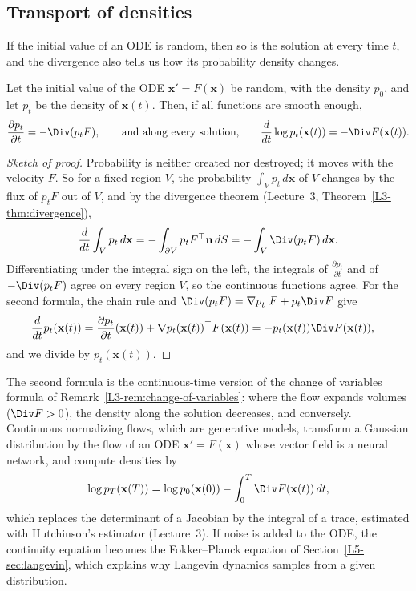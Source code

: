 \subsection{Transport of densities}

If the initial value of an ODE is random, then so is the solution at every time $t$, and the divergence also tells us how its probability density changes.

\begin{proposition}\label{L5-prop:continuity}
    Let the initial value of the ODE $\mathbf{x}' = F(\mathbf{x})$ be random, with the density $p_0$, and let $p_t$ be the density of $\mathbf{x}(t)$. Then, if all functions are smooth enough,
    \[\frac{\partial p_t}{\partial t} = -\Div(p_tF), \qquad \text{and along every solution,} \qquad \frac{d}{dt}\log p_t(\mathbf{x}(t)) = -\Div F(\mathbf{x}(t)).\]
\end{proposition}

\begin{proof}[Sketch of proof]
    Probability is neither created nor destroyed; it moves with the velocity $F$. So for a fixed region $V$, the probability $\int_V p_t\, d\mathbf{x}$ of $V$ changes by the flux of $p_tF$ out of $V$, and by the divergence theorem (Lecture~3, Theorem~\ref{L3-thm:divergence}),
    \[\frac{d}{dt}\int_V p_t\, d\mathbf{x} = -\int_{\partial V} p_tF^\top\mathbf{n}\, dS = -\int_V \Div(p_tF)\, d\mathbf{x}.\]
    Differentiating under the integral sign on the left, the integrals of $\frac{\partial p_t}{\partial t}$ and of $-\Div(p_tF)$ agree on every region $V$, so the continuous functions agree. For the second formula, the chain rule and $\Div(p_tF) = \nabla p_t^\top F + p_t\Div F$ give
    \begin{align*}
        \frac{d}{dt}p_t(\mathbf{x}(t)) &= \frac{\partial p_t}{\partial t}(\mathbf{x}(t)) + \nabla p_t(\mathbf{x}(t))^\top F(\mathbf{x}(t)) = -p_t(\mathbf{x}(t))\Div F(\mathbf{x}(t)),
    \end{align*}
    and we divide by $p_t(\mathbf{x}(t))$.
\end{proof}

The second formula is the continuous-time version of the change of variables formula of Remark~\ref{L3-rem:change-of-variables}: where the flow expands volumes ($\Div F > 0$), the density along the solution decreases, and conversely. Continuous normalizing flows, which are generative models, transform a Gaussian distribution by the flow of an ODE $\mathbf{x}' = F(\mathbf{x})$ whose vector field is a neural network, and compute densities by
\[\log p_T(\mathbf{x}(T)) = \log p_0(\mathbf{x}(0)) - \int_0^T \Div F(\mathbf{x}(t))\, dt,\]
which replaces the determinant of a Jacobian by the integral of a trace, estimated with Hutchinson's estimator (Lecture~3). If noise is added to the ODE, the continuity equation becomes the Fokker--Planck equation of Section~\ref{L5-sec:langevin}, which explains why Langevin dynamics samples from a given distribution.

